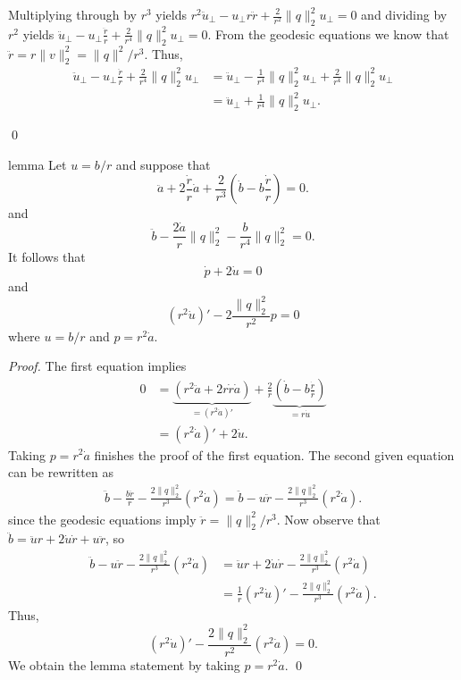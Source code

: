 \documentclass{article}
\begin{document}
Multiplying through by $r^3$ yields $r^2 \ddot u_{\perp} - u_\perp r\ddot r + \frac{2}{r^2}\|q\|_2^2u_{\perp} = 0$ and dividing by $r^2$ yields $\ddot u_{\perp} - u_\perp \frac{\ddot r}{r} + \frac{2}{r^4}\|q\|_2^2u_{\perp} = 0$. From the geodesic equations we know that $\ddot r = r\|v\|_2^2 = \|q\|^2/r^3$. Thus,
\begin{align}
    \ddot u_{\perp} - u_\perp \frac{\ddot r}{r} + \frac{2}{r^4}\|q\|_2^2u_{\perp} &= \ddot u_{\perp} -  \frac{1}{r^4}\|q\|_2^2u_\perp + \frac{2}{r^4}\|q\|_2^2u_{\perp} \\
    &= \ddot u_{\perp} + \frac{1}{r^4}\|q\|_2^2u_\perp.
\end{align}

\qed{}

\begin{restatable}{lemma}{} \label{lemma: parallel jacobi equation}
    Let $u = b/r$ and suppose that
    \begin{equation}
        \ddot a + 2\frac{\dot r}{r}\dot a + \frac{2}{r^3}\left(\dot b - b\frac{ \dot r}{r}\right) = 0.
    \end{equation}
    and
    \begin{equation}
        \ddot b - \frac{2\dot a}{r}\|q\|_2^2 - \frac{b}{r^4} \|q\|_2^2 = 0.
    \end{equation}
    It follows that
    \begin{equation}
        \dot p + 2\dot u = 0
    \end{equation}
    and 
    \begin{equation}
        (r^2\dot u)' - 2\frac{\|q\|_2^2}{r^2}p = 0
    \end{equation}
    where $u = b/r$ and $p = r^2\dot a$.
\end{restatable}
\noindent \textit{Proof.} The first equation implies
\begin{align}
    0 &= \underbrace{(r^2\ddot a + 2r\dot r\dot a)}_{ = (r^2\dot a)'} + \frac{2}{r}\underbrace{\left(\dot b - b\frac{ \dot r}{r}\right)}_{ = r\dot u} \\
    &= (r^2\dot a)' + 2\dot u.
\end{align}
Taking $p = r^2 \dot a$ finishes the proof of the first equation. The second given equation can be rewritten as 
\begin{align}
    \ddot b  - \frac{b\ddot r}{r} - \frac{2\|q\|_2^2}{r^3}(r^2\dot a) = \ddot b - u\ddot r - \frac{2\|q\|_2^2}{r^3}(r^2\dot a).
\end{align}
since the geodesic equations imply $\ddot r = \|q\|_2^2/r^3.$ Now observe that $\ddot b = \ddot u r + 2\dot u \dot r + u\ddot r$, so 
\begin{align}
    \ddot b - u\ddot r - \frac{2\|q\|_2^2}{r^3}(r^2\dot a) &= \ddot u r  + 2\dot u \dot r - \frac{2\|q\|_2^2}{r^3}(r^2\dot a) \\
    &= \frac{1}{r}(r^2\dot u)' - \frac{2\|q\|_2^2}{r^3}(r^2\dot a).
\end{align}
Thus,
\begin{equation}
    (r^2\dot u)' - \frac{2\|q\|_2^2}{r^2}(r^2\dot a) = 0.
\end{equation}
We obtain the lemma statement by taking $p = r^2\dot a$.  
\qed{}
\end{document}
